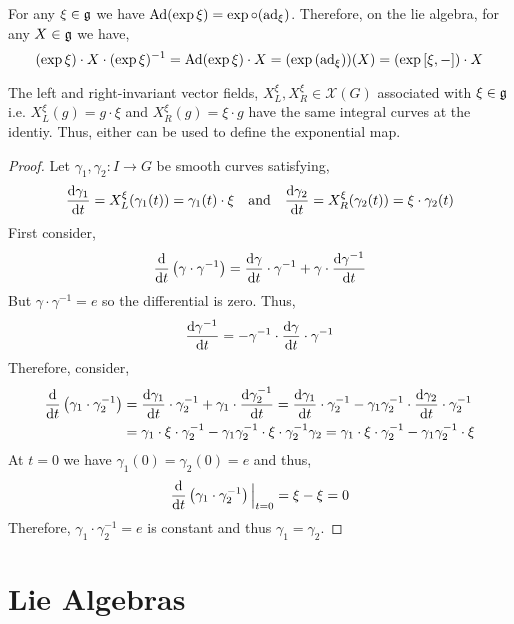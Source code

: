 \documentclass[12pt]{article}
\begin{document}
\begin{corollary}
For any $\xi \in \mathfrak{g}$ we have $\mathrm{Ad}(\exp{\xi}) = \exp \circ (\mathrm{ad}_\xi)$. Therefore, on the lie algebra, for any $X \in \mathfrak{g}$ we have,
\[ (\exp{\xi}) \cdot X \cdot (\exp{\xi})^{-1} = \mathrm{Ad}(\exp{\xi}) \cdot X = (\exp{(\mathrm{ad}_\xi)})(X) = (\exp{[\xi, - ]}) \cdot X \]  
\end{corollary}

\begin{proposition}
The left and right-invariant vector fields, $X^{\xi}_L, X^{\xi}_R \in \mathscr{X}(G)$ associated with $\xi \in \mathfrak{g}$ i.e. $X^{\xi}_L(g) = g \cdot \xi$ and $X^{\xi}_R(g) = \xi \cdot g$ have the same integral curves at the identiy. Thus, either can be used to define the exponential map.
\end{proposition}

\begin{proof}
Let $\gamma_1, \gamma_2 : I \to G$ be smooth curves satisfying,
\[ \frac{\mathrm{d}{\gamma_1}}{\mathrm{d}{t}} = X^{\xi}_L(\gamma_1(t)) = \gamma_1(t) \cdot \xi \quad \text{and} \quad \frac{\mathrm{d}{\gamma_2}}{\mathrm{d}{t}} = X^{\xi}_R(\gamma_2(t)) = \xi \cdot \gamma_2(t) \]
First consider,
\[ \frac{\mathrm{d}{}}{\mathrm{d}{t}} \left( \gamma \cdot \gamma^{-1} \right) = \frac{\mathrm{d}{\gamma}}{\mathrm{d}{t}} \cdot \gamma^{-1} + \gamma \cdot \frac{\mathrm{d}{\gamma^{-1}}}{\mathrm{d}{t}} \]
But $\gamma \cdot \gamma^{-1} = e$ so the differential is zero. Thus, 
\[ \frac{\mathrm{d}{\gamma^{-1}}}{\mathrm{d}{t}} = - \gamma^{-1} \cdot \frac{\mathrm{d}{\gamma}}{\mathrm{d}{t}} \cdot \gamma^{-1} \]
Therefore, consider,
\begin{align*}
\frac{\mathrm{d}{}}{\mathrm{d}{t}} \left( \gamma_1 \cdot \gamma_2^{-1} \right) & = \frac{\mathrm{d}{\gamma_1}}{\mathrm{d}{t}} \cdot \gamma_2^{-1} + \gamma_1 \cdot \frac{\mathrm{d}{\gamma_2^{-1}}}{\mathrm{d}{t}} = \frac{\mathrm{d}{\gamma_1}}{\mathrm{d}{t}} \cdot \gamma_2^{-1} - \gamma_1 \gamma_2^{-1} \cdot \frac{\mathrm{d}{\gamma_2}}{\mathrm{d}{t}} \cdot \gamma_2^{-1} 
\\
& = \gamma_1 \cdot \xi \cdot \gamma_2^{-1} - \gamma_1 \gamma_2^{-1} \cdot \xi \cdot \gamma_2^{-1} \gamma_2 = \gamma_1 \cdot \xi \cdot \gamma_2^{-1} - \gamma_1 \gamma_2^{-1} \cdot \xi
\end{align*}
At $t = 0$ we have $\gamma_1(0) = \gamma_2(0) = e$ and thus,
\[ \frac{\mathrm{d}{}}{\mathrm{d}{t}} \left( \gamma_1 \cdot \gamma_2^{-1} \right) \Big|_{t = 0} = \xi - \xi = 0 \]
Therefore, $\gamma_1 \cdot \gamma_2^{-1} = e$ is constant and thus $\gamma_1 = \gamma_2$. 
\end{proof}


\section{Lie Algebras}
\end{document}
